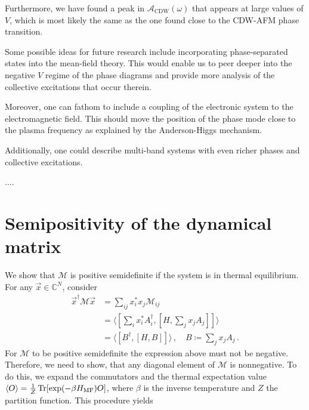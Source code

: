 \documentclass[
    reprint, 
    aps,
    preprintnumbers,
    twocolumn,
    prb,
    superscriptaddress
]{revtex4-2}
\newcommand{\mM}{\mathcal{M}}
\newcommand{\spectral}[1]{\mathcal{A}_\text{#1}  (\omega)}
\begin{document}
Furthermore, we have found a peak in $\spectral{CDW}$ that appears at large values of $V$, 
which is most likely the same as the one found close to the CDW-AFM phase transition. 


Some possible ideas for future research include incorporating phase-separated states into the mean-field theory.
This would enable us to peer deeper into the negative $V$ regime of the phase diagrams and provide more analysis of the collective excitations that occur therein.

Moreover, one can fathom to include a coupling of the electronic system to the electromagnetic field.
This should move the position of the phase mode close to the plasma frequency as explained by the Anderson-Higgs mechanism.

Additionally, one could describe multi-band systems with even richer phases and collective excitations. 


\begin{acknowledgments} 
    ....
\end{acknowledgments}

\appendix
\section{Semipositivity of the dynamical matrix}
\label{sec:positive_M}

We show that $\mathcal{M}$ is positive semidefinite if the system is in thermal equilibrium.
For any $\vec{x} \in \mathbb{C}^N$, consider
\begin{align}
    \vec{x}^\dagger \mM \vec{x} &= \sum_{ij} x_i^* x_j \mM_{ij} \nonumber \\
        &= \langle \left[ \sum_i x_i^* A_i^\dagger, \left[ H, \sum_j x_j A_j \right] \right]  \rangle \nonumber \\
        &= \langle [B^\dagger, [H, B]] \rangle\,,\quad B \coloneqq  \sum_j x_j A_j\,.
\end{align}
For $\mM$ to be positive semidefinite the expression above must not be negative.
Therefore, we need to show, that any diagonal element of $\mM$ is nonnegative.
To do this, we expand the commutators and the thermal expectation value $\langle O \rangle = \frac{1}{Z} \Trace [\exp(-\beta H_\text{MF}) O]$, 
where $\beta$ is the inverse temperature and $Z$ the partition function.
This procedure yields
\end{document}
